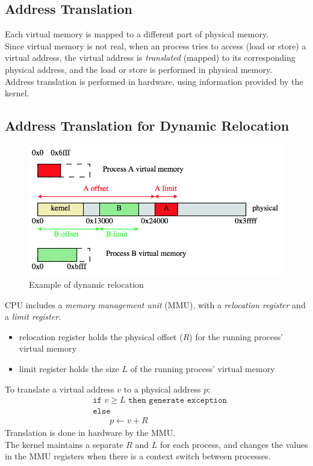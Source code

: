 \documentclass[12pt]{article}
\theoremstyle{plain}
\theoremstyle{definition}
\begin{document}
\subsection{Address Translation}
Each virtual memory is mapped to a different part of physical memory. \\
Since virtual memory is not real, when an process tries to access (load or store) a virtual address, the virtual address is \emph{translated} (mapped) to its corresponding physical address, and the load or store is performed in physical memory. \\
Address translation is performed in hardware, using information provided by the kernel.

\subsection{Address Translation for Dynamic Relocation}
\begin{figure}[!h]
  \centering
  \includegraphics[scale=0.6]{pictures/dyn_reloc.png}
  \caption{Example of dynamic relocation}
  \label{fig:dyn_reloc_ex}
\end{figure}
CPU includes a \emph{memory management unit} (MMU), with a \emph{relocation register} and a \emph{limit register}.
\begin{itemize}
  \item relocation register holds the physical offset ($R$) for the running process' virtual memory
  \item limit register holds the size $L$ of the running process' virtual memory
\end{itemize}
To translate a virtual address $v$ to a physical address $p$:
\begin{align*}
&\texttt{if } v \geq L \texttt{ then generate exception} \\
&\texttt{else} \\
&\qquad p \leftarrow v + R
\end{align*}
Translation is done in hardware by the MMU. \\
The kernel maintains a separate $R$ and $L$ for each process, and changes the values in the MMU registers when there is a context switch between processes. \\
\end{document}
